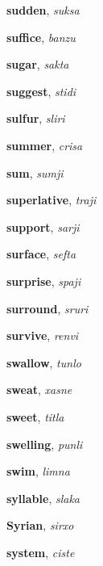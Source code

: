 \documentclass[12pt]{book}
\begin{document}
\begin{description}
\item[ ] \textbf{sudden}, \textit{suksa}

\item[ ] \textbf{suffice}, \textit{banzu}

\item[ ] \textbf{sugar}, \textit{sakta}

\item[ ] \textbf{suggest}, \textit{stidi}

\item[ ] \textbf{sulfur}, \textit{sliri}

\item[ ] \textbf{summer}, \textit{crisa}

\item[ ] \textbf{sum}, \textit{sumji}

\item[ ] \textbf{superlative}, \textit{traji}

\item[ ] \textbf{support}, \textit{sarji}

\item[ ] \textbf{surface}, \textit{sefta}

\item[ ] \textbf{surprise}, \textit{spaji}

\item[ ] \textbf{surround}, \textit{sruri}

\item[ ] \textbf{survive}, \textit{renvi}

\item[ ] \textbf{swallow}, \textit{tunlo}

\item[ ] \textbf{sweat}, \textit{xasne}

\item[ ] \textbf{sweet}, \textit{titla}

\item[ ] \textbf{swelling}, \textit{punli}

\item[ ] \textbf{swim}, \textit{limna}

\item[ ] \textbf{syllable}, \textit{slaka}

\item[ ] \textbf{Syrian}, \textit{sirxo}

\item[ ] \textbf{system}, \textit{ciste}



\end{description}
\end{document}
